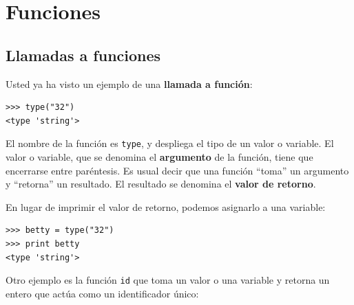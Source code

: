 


\chapter{Funciones}
\label{floatchap}

\section{Llamadas a funciones}
\label{functionchap}

Usted ya ha visto un ejemplo de una {\bf llamada a función}:

\beforeverb
\begin{verbatim}
>>> type("32")
<type 'string'>
\end{verbatim}
\afterverb
%
El nombre de la función es  \texttt{type}, y despliega el tipo de un 
valor o variable. El valor o variable, que se denomina el 
{\bf argumento} de la función, tiene que encerrarse entre paréntesis.
Es usual decir que una función ``toma'' un argumento y ``retorna'' un resultado.
El resultado se denomina el  {\bf valor de retorno}.


En lugar de imprimir el valor de retorno, podemos asignarlo a una variable:

\beforeverb
\begin{verbatim}
>>> betty = type("32")
>>> print betty
<type 'string'>
\end{verbatim}
\afterverb
%
Otro  ejemplo es la función \texttt{id} que toma un valor o una variable y
retorna un entero que actúa como un identificador único:

